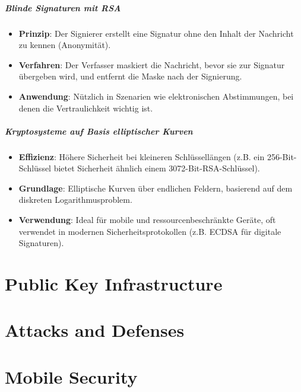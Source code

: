 \documentclass{article}
\begin{document}
\subsubsection{Blinde Signaturen mit RSA}
\begin{itemize}
  \item \textbf{Prinzip}: Der Signierer erstellt eine Signatur ohne den Inhalt der Nachricht zu kennen (Anonymität).
  \item \textbf{Verfahren}: Der Verfasser maskiert die Nachricht, bevor sie zur Signatur übergeben wird, und entfernt die Maske nach der Signierung.
  \item \textbf{Anwendung}: Nützlich in Szenarien wie elektronischen Abstimmungen, bei denen die Vertraulichkeit wichtig ist.
\end{itemize}

\subsubsection{Kryptosysteme auf Basis elliptischer Kurven}
\begin{itemize}
  \item \textbf{Effizienz}: Höhere Sicherheit bei kleineren Schlüssellängen (z.B. ein 256-Bit-Schlüssel bietet Sicherheit ähnlich einem 3072-Bit-RSA-Schlüssel).
  \item \textbf{Grundlage}: Elliptische Kurven über endlichen Feldern, basierend auf dem diskreten Logarithmusproblem.
  \item \textbf{Verwendung}: Ideal für mobile und ressourcenbeschränkte Geräte, oft verwendet in modernen Sicherheitsprotokollen (z.B. ECDSA für digitale Signaturen).
\end{itemize}



\part{Public Key Infrastructure}





\part{Attacks and Defenses}





\part{Mobile Security}

\end{document}

